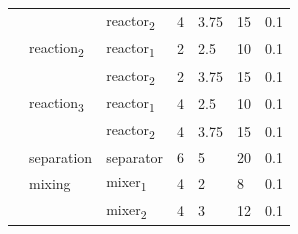 \documentclass[11pt]{article}
\begin{document}
\begin{table}[htbp]
{\begin{tabular}{lllllll}
                & & reactor\textsubscript{2} & 4 & 3.75 & 15 & 0.1 \\
                & reaction\textsubscript{2} & reactor\textsubscript{1} & 2 & 2.5 & 10 & 0.1 \\
                & & reactor\textsubscript{2} & 2 & 3.75 & 15 & 0.1 \\
                & reaction\textsubscript{3} & reactor\textsubscript{1} & 4 & 2.5 & 10 & 0.1 \\
                & & reactor\textsubscript{2} & 4 & 3.75 & 15 & 0.1 \\
                & separation & separator & 6 & 5 & 20 & 0.1 \\
                & mixing & mixer\textsubscript{1} & 4 & 2 & 8 & 0.1 \\
                & & mixer\textsubscript{2} & 4 & 3 & 12 & 0.1 \\
        \bottomrule
    \end{tabular}
}
\end{table}
\end{document}
